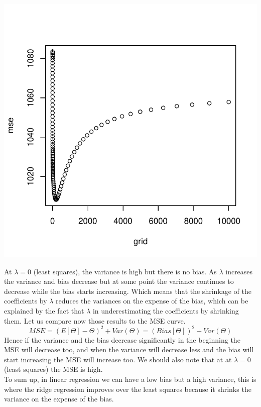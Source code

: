 \documentclass[]{report}
\begin{document}
\begin{center}
	\includegraphics{Figures/ridge_mse.pdf}
\end{center}

At $\lambda=0$ (least squares), the variance is high but there is no bias.
As $\lambda$ increases the variance and bias decrease but at some point the variance continues to decrease while the bias starts increasing. Which means that the shrinkage of the coefficients by $\lambda$ reduces the variances on the expense of the bias, which can be explained by the fact that $\lambda$ in underestimating the coefficients by shrinking them. Let us compare now those results to the MSE curve. 
$$MSE = (E[\varTheta]-\varTheta)^{2} + Var(\varTheta) = (Bias[\varTheta])^{2} + Var(\varTheta)$$
Hence if the variance and the bias decrease significantly in the beginning the MSE will decrease too, and when the variance will decrease less and the bias will start increasing the MSE will increase too. We should also note that at at  $\lambda=0$ (least squares) the MSE is high.\\
To sum up, in linear regression we can have a low bias but a high variance, this is where the ridge regression improves over the least squares because it shrinks the variance on the expense of the bias.
  
\end{document}
